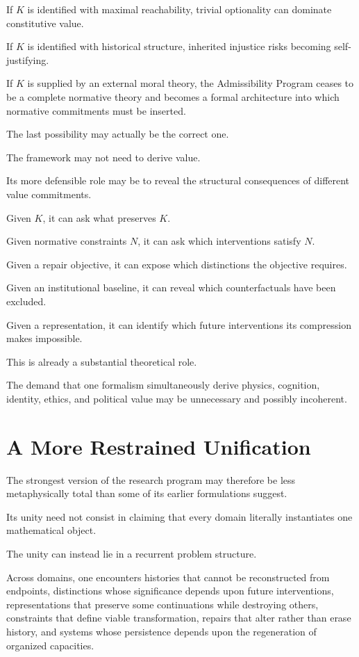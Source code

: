 \documentclass[11pt]{article}
\theoremstyle{remark}
\begin{document}
If $K$ is identified with maximal reachability, trivial optionality can dominate constitutive value.

If $K$ is identified with historical structure, inherited injustice risks becoming self-justifying.

If $K$ is supplied by an external moral theory, the Admissibility Program ceases to be a complete normative theory and becomes a formal architecture into which normative commitments must be inserted.

The last possibility may actually be the correct one.

The framework may not need to derive value.

Its more defensible role may be to reveal the structural consequences of different value commitments.

Given $K$, it can ask what preserves $K$.

Given normative constraints $N$, it can ask which interventions satisfy $N$.

Given a repair objective, it can expose which distinctions the objective requires.

Given an institutional baseline, it can reveal which counterfactuals have been excluded.

Given a representation, it can identify which future interventions its compression makes impossible.

This is already a substantial theoretical role.

The demand that one formalism simultaneously derive physics, cognition, identity, ethics, and political value may be unnecessary and possibly incoherent.

\section{A More Restrained Unification}

The strongest version of the research program may therefore be less metaphysically total than some of its earlier formulations suggest.

Its unity need not consist in claiming that every domain literally instantiates one mathematical object.

The unity can instead lie in a recurrent problem structure.

Across domains, one encounters histories that cannot be reconstructed from endpoints, distinctions whose significance depends upon future interventions, representations that preserve some continuations while destroying others, constraints that define viable transformation, repairs that alter rather than erase history, and systems whose persistence depends upon the regeneration of organized capacities.
\end{document}
